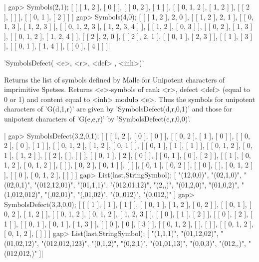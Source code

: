 |    gap> Symbols(2,1);
    [ [ [ 1, 2 ], [ 0 ] ], [ [ 0, 2 ], [ 1 ] ], [ [ 0, 1, 2 ], [ 1, 2 ] ],
      [ [ 2 ], [  ] ], [ [ 0, 1 ], [ 2 ] ] ]
    gap> Symbols(4,0);
    [ [ [ 1, 2 ], 2, 0 ], [ [ 1, 2 ], 2, 1 ],
      [ [ 0, 1, 3 ], [ 1, 2, 3 ] ], [ [ 0, 1, 2, 3 ], [ 1, 2, 3, 4 ] ],
      [ [ 1, 2 ], [ 0, 3 ] ], [ [ 0, 2 ], [ 1, 3 ] ],
      [ [ 0, 1, 2 ], [ 1, 2, 4 ] ], [ [ 2 ], 2, 0 ], [ [ 2 ], 2, 1 ],
      [ [ 0, 1 ], [ 2, 3 ] ], [ [ 1 ], [ 3 ] ], [ [ 0, 1 ], [ 1, 4 ] ],
      [ [ 0 ], [ 4 ] ] ]|


'SymbolsDefect( <e>, <r>, <def> , <inh>)'

Returns  the list of  symbols defined by  Malle for Unipotent characters of
imprimitive  Spetses. Returns <e>-symbols of  rank <r>, defect <def> (equal
to  0 or  1) and  content equal  to <inh>  modulo <e>. Thus the symbols for
unipotent  characters of  'G(d,1,r)' are  given by 'SymbolsDefect(d,r,0,1)'
and those for unipotent characters of 'G(e,e,r)' by
'SymbolsDefect(e,r,0,0)'.

|    gap> SymbolsDefect(3,2,0,1);
    [ [ [ 1, 2 ], [ 0 ], [ 0 ] ], [ [ 0, 2 ], [ 1 ], [ 0 ] ],
      [ [ 0, 2 ], [ 0 ], [ 1 ] ], [ [ 0, 1, 2 ], [ 1, 2 ], [ 0, 1 ] ],
      [ [ 0, 1 ], [ 1 ], [ 1 ] ], [ [ 0, 1, 2 ], [ 0, 1 ], [ 1, 2 ] ],
      [ [ 2 ], [  ], [  ] ], [ [ 0, 1 ], [ 2 ], [ 0 ] ],
      [ [ 0, 1 ], [ 0 ], [ 2 ] ], [ [ 1 ], [ 0, 1, 2 ], [ 0, 1, 2 ] ],
      [ [  ], [ 0, 2 ], [ 0, 1 ] ], [ [  ], [ 0, 1 ], [ 0, 2 ] ],
      [ [ 0 ], [  ], [ 0, 1, 2 ] ], [ [ 0 ], [ 0, 1, 2 ], [  ] ] ]
    gap> List(last,StringSymbol);
    [ "(12,0,0)", "(02,1,0)", "(02,0,1)", "(012,12,01)", "(01,1,1)",
      "(012,01,12)", "(2,,)", "(01,2,0)", "(01,0,2)", "(1,012,012)",
      "(,02,01)", "(,01,02)", "(0,,012)", "(0,012,)" ]
    gap> SymbolsDefect(3,3,0,0);
    [ [ [ 1 ], [ 1 ], [ 1 ] ], [ [ 0, 1 ], [ 1, 2 ], [ 0, 2 ] ],
      [ [ 0, 1 ], [ 0, 2 ], [ 1, 2 ] ],
      [ [ 0, 1, 2 ], [ 0, 1, 2 ], [ 1, 2, 3 ] ], [ [ 0 ], [ 1 ], [ 2 ] ],
      [ [ 0 ], [ 2 ], [ 1 ] ], [ [ 0, 1 ], [ 0, 1 ], [ 1, 3 ] ],
      [ [ 0 ], [ 0 ], [ 3 ] ], [ [ 0, 1, 2 ], [  ], [  ] ],
      [ [ 0, 1, 2 ], [ 0, 1, 2 ], [  ] ] ]
    gap> List(last,StringSymbol);
    [ "(1,1,1)", "(01,12,02)", "(01,02,12)", "(012,012,123)", "(0,1,2)",
      "(0,2,1)", "(01,01,13)", "(0,0,3)", "(012,,)", "(012,012,)" ]|

%
%

